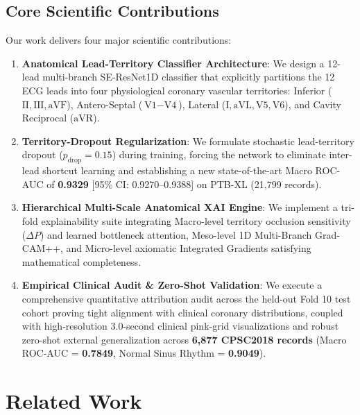 \documentclass[12pt]{elsarticle}
\begin{document}
\subsection{Core Scientific Contributions}
Our work delivers four major scientific contributions:
\begin{enumerate}
    \item \textbf{Anatomical Lead-Territory Classifier Architecture}: We design a 12-lead multi-branch SE-ResNet1D classifier that explicitly partitions the 12 ECG leads into four physiological coronary vascular territories: Inferior ($\text{II}, \text{III}, \text{aVF}$), Antero-Septal ($\text{V1}-\text{V4}$), Lateral ($\text{I}, \text{aVL}, \text{V5}, \text{V6}$), and Cavity Reciprocal ($\text{aVR}$).
    \item \textbf{Territory-Dropout Regularization}: We formulate stochastic lead-territory dropout ($p_{\text{drop}} = 0.15$) during training, forcing the network to eliminate inter-lead shortcut learning and establishing a new state-of-the-art Macro ROC-AUC of \textbf{0.9329} [95\% CI: 0.9270--0.9388] on PTB-XL (21,799 records).
    \item \textbf{Hierarchical Multi-Scale Anatomical XAI Engine}: We implement a tri-fold explainability suite integrating Macro-level territory occlusion sensitivity ($\Delta P$) and learned bottleneck attention, Meso-level 1D Multi-Branch Grad-CAM++, and Micro-level axiomatic Integrated Gradients satisfying mathematical completeness.
    \item \textbf{Empirical Clinical Audit \& Zero-Shot Validation}: We execute a comprehensive quantitative attribution audit across the held-out Fold 10 test cohort proving tight alignment with clinical coronary distributions, coupled with high-resolution 3.0-second clinical pink-grid visualizations and robust zero-shot external generalization across \textbf{6,877 CPSC2018 records} (Macro ROC-AUC = \textbf{0.7849}, Normal Sinus Rhythm = \textbf{0.9049}).
\end{enumerate}


\section{Related Work}
\label{sec:related}
\end{document}
